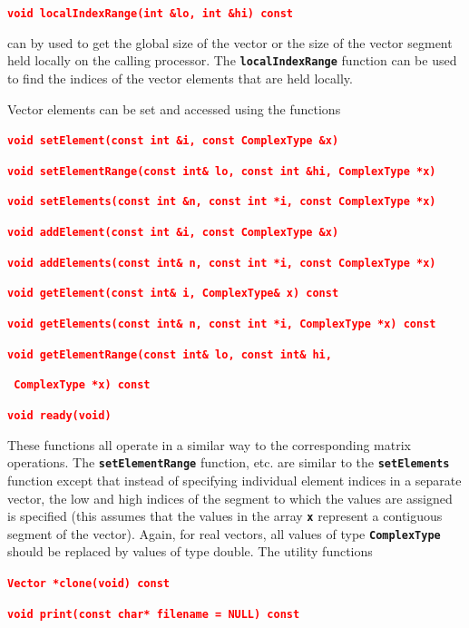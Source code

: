 \documentclass[12pt]{report} %
\begin{document}
\textcolor{red}{\texttt{\textbf{void localIndexRange(int \&lo, int \&hi) const}}}

can by used to get the global size of the vector or the size of the vector segment held locally on the calling processor. The \texttt{\textbf{localIndexRange}} function can be used to find the indices of the vector elements that are held locally.

Vector elements can be set and accessed using the functions

\textcolor{red}{\texttt{\textbf{void setElement(const int \&i, const ComplexType \&x)}}}

\textcolor{red}{\texttt{\textbf{void setElementRange(const int\& lo, const int \&hi, ComplexType *x)}}}

\textcolor{red}{\texttt{\textbf{void setElements(const int \&n, const int *i, const ComplexType *x)}}}

\textcolor{red}{\texttt{\textbf{void addElement(const int \&i, const ComplexType \&x)}}}

\textcolor{red}{\texttt{\textbf{void addElements(const int\& n, const int *i, const ComplexType *x)}}}

\textcolor{red}{\texttt{\textbf{void getElement(const int\& i, ComplexType\& x) const}}}

\textcolor{red}{\texttt{\textbf{void getElements(const int\& n, const int *i, ComplexType *x) const}}}

\textcolor{red}{\texttt{\textbf{void getElementRange(const int\& lo, const int\& hi,}}}

\textcolor{red}{\texttt{\textbf{                     ComplexType *x) const}}}

\textcolor{red}{\texttt{\textbf{void ready(void)}}}

These functions all operate in a similar way to the corresponding matrix operations. The \texttt{\textbf{setElementRange}} function, etc. are similar to the \texttt{\textbf{setElements}} function except that instead of specifying individual element indices in a separate vector, the low and high indices of the segment to which the values are assigned is specified (this assumes that the values in the array \texttt{\textbf{x}} represent a contiguous segment of the vector).  Again, for real vectors, all values of type \texttt{\textbf{ComplexType}} should be replaced by values of type double. The utility functions

\textcolor{red}{\texttt{\textbf{Vector *clone(void) const}}}

\textcolor{red}{\texttt{\textbf{void print(const char* filename = NULL) const}}}
\end{document}
